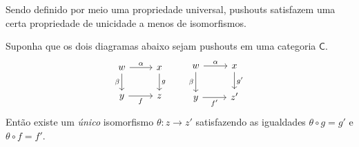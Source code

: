 Sendo definido por meio uma propriedade universal, pushouts satisfazem uma certa propriedade de unicidade a menos de isomorfismos.

\begin{prop}
    Suponha que os dois diagramas abaixo sejam pushouts em uma categoria $\mathsf{C}$.
    \begin{displaymath}
        \begin{tikzcd}
            w
            \arrow[r, "\alpha"]
            \arrow[d, "\beta" swap]
            & x
            \arrow[d, "g"]
            \\ y
            \arrow[r, "f" swap]
            & z
        \end{tikzcd}
        \qquad
        \begin{tikzcd}
            w
            \arrow[r, "\alpha"]
            \arrow[d, "\beta" swap]
            & x
            \arrow[d, "g'"]
            \\ y
            \arrow[r, "f'" swap]
            & z'
        \end{tikzcd}
    \end{displaymath}
    Então existe um \emph{único} isomorfismo $\theta: z \to z'$ satisfazendo as igualdades $\theta \circ g = g'$ e $\theta \circ f = f'$.
\end{prop}

